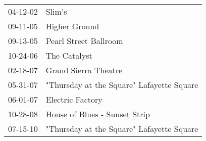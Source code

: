 \begin{supertabular}{p{0.07\textwidth}p{0.23\textwidth}}
 04-12-02 &                                     Slim's \\
 09-11-05 &                              Higher Ground \\
 09-13-05 &                      Pearl Street Ballroom \\
 10-24-06 &                               The Catalyst \\
 02-18-07 &                       Grand Sierra Theatre \\
 05-31-07 &  "Thursday at the Square" Lafayette Square \\
 06-01-07 &                           Electric Factory \\
 10-28-08 &              House of Blues - Sunset Strip \\
 07-15-10 &  "Thursday at the Square" Lafayette Square \\
\end{supertabular}
